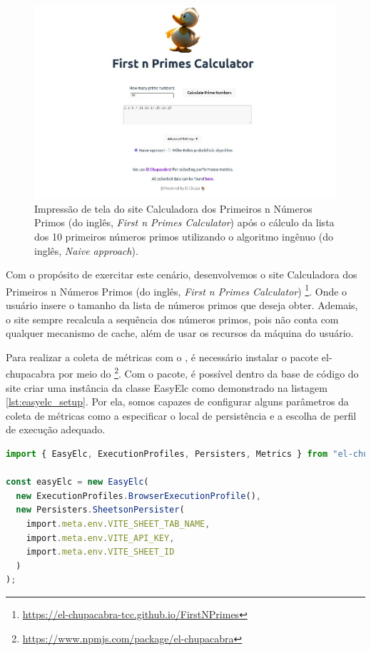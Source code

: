 \documentclass[12pt]{tcc}
\begin{document}
	\begin{figure}[!ht]
		\centering
		\includegraphics[width=1\textwidth]{figures/print-elc-numeros-primos.jpeg}
		\caption[Impressão de tela do site Calculadora dos Primeiros n Números Primos]{Impressão de tela do site Calculadora dos Primeiros n Números Primos (do inglês, \emph{First n Primes Calculator}) após o cálculo da lista dos 10 primeiros números primos utilizando o algoritmo ingênuo (do inglês, \emph{Naive approach}).}
		\label{fig:site-numeros-primos}
	\end{figure}

	Com o propósito de exercitar este cenário, desenvolvemos o site Calculadora dos Primeiros n Números Primos (do inglês, \emph{First n Primes Calculator})
	\footnote{\url{https://el-chupacabra-tcc.github.io/FirstNPrimes}}.
	Onde o usuário insere o tamanho da lista de números primos que deseja obter.
	Ademais, o site sempre recalcula a sequência dos números primos, pois não conta com qualquer mecanismo de cache, além de usar os recursos da máquina do usuário.

	Para realizar a coleta de métricas com o , é necessário instalar o pacote el-chupacabra por meio do \footnote{\url{https://www.npmjs.com/package/el-chupacabra}}.
	Com o pacote, é possível dentro da base de código do site criar uma instância da classe EasyElc como demonstrado na listagem \ref{lst:easyelc_setup}.
	Por ela, somos capazes de configurar alguns parâmetros da coleta de métricas como a especificar o local de persistência e a escolha de perfil de execução adequado.

	\begin{minipage}{\linewidth}


	\begin{lstlisting}[label={lst:easyelc_setup}, caption={Instância do módulo EasyElc no site Calculadora dos Primeiros n Números Primos.}, language=TypeScript, breaklines=true]
import { EasyElc, ExecutionProfiles, Persisters, Metrics } from "el-chupacabra"

const easyElc = new EasyElc(
  new ExecutionProfiles.BrowserExecutionProfile(),
  new Persisters.SheetsonPersister(
    import.meta.env.VITE_SHEET_TAB_NAME,
    import.meta.env.VITE_API_KEY,
    import.meta.env.VITE_SHEET_ID
  )
);
	\end{lstlisting}

	\end{minipage}
\end{document}
